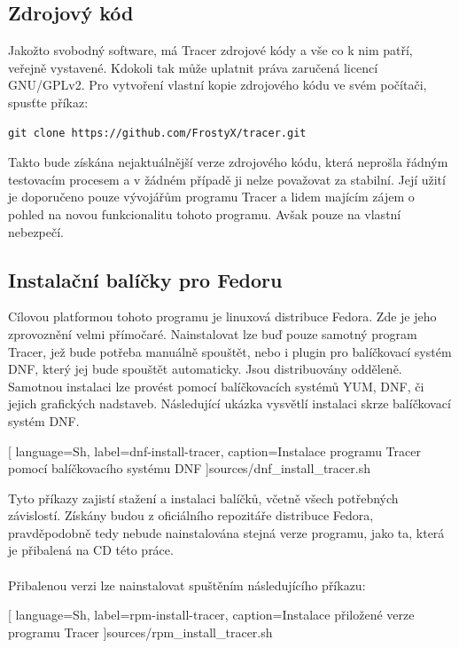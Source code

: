 \documentclass[
  field=inf,
  biblatex,
  glossaries,
  index
]{kidiplom}
\begin{document}
	\subsection{Zdrojový kód}
	Jakožto svobodný software, má Tracer zdrojové kódy a vše co k nim patří, veřejně vystavené. Kdokoli tak může uplatnit práva zaručená licencí GNU/GPLv2. Pro vytvoření vlastní kopie zdrojového kódu ve svém počítači, spusťte příkaz:

	\begin{lstlisting}[gobble=12]
		git clone https://github.com/FrostyX/tracer.git
	\end{lstlisting}

	Takto bude získána nejaktuálnější verze zdrojového kódu, která neprošla řádným testovacím procesem a v žádném případě ji nelze považovat za stabilní. Její užití je doporučeno pouze vývojářům programu Tracer a lidem majícím zájem o pohled na novou funkcionalitu tohoto programu. Avšak pouze na vlastní nebezpečí.

	\subsection{Instalační balíčky pro Fedoru}
	Cílovou platformou tohoto programu je linuxová distribuce Fedora. Zde je jeho zprovoznění velmi přímočaré. Nainstalovat lze buď pouze samotný program Tracer, jež bude potřeba manuálně spouštět, nebo i plugin pro balíčkovací systém DNF\@, který jej bude spouštět automaticky. Jsou distribuovány odděleně. Samotnou instalaci lze provést pomocí balíčkovacích systémů YUM, DNF, či jejich grafických nadstaveb. Následující ukázka vysvětlí instalaci skrze balíčkovací systém DNF.

	
	[
		language=Sh,
		label=dnf-install-tracer,
		caption={Instalace programu Tracer pomocí balíčkovacího systému DNF}
	]{sources/dnf_install_tracer.sh}

	Tyto příkazy zajistí stažení a instalaci balíčků, včetně všech potřebných závislostí. Získány budou z oficiálního repozitáře distribuce Fedora, pravděpodobně tedy nebude nainstalována stejná verze programu, jako ta, která je přibalená na CD této práce.
	\\
	\\
	Přibalenou verzi lze nainstalovat spuštěním následujícího příkazu:

	
	[
		language=Sh,
		label=rpm-install-tracer,
		caption={Instalace přiložené verze programu Tracer}
	]{sources/rpm_install_tracer.sh}
\end{document}
